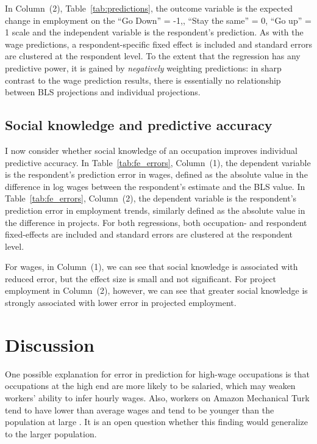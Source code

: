 \documentclass[12pt]{article}
\begin{document}
In Column~(2), Table~\ref{tab:predictions}, the outcome variable is the expected change in employment on the ``Go Down'' = -1,, ``Stay the same'' = 0, ``Go up'' = 1 scale and the independent variable is the respondent's prediction. 
As with the wage predictions, a respondent-specific fixed effect is included and standard errors are clustered at the respondent level. 
To the extent that the regression has any predictive power, it is gained by \emph{negatively} weighting predictions:
in sharp contrast to the wage prediction results, there is essentially no relationship between BLS projections and individual projections. 

\subsection{Social knowledge and predictive accuracy}

I now consider whether social knowledge of an occupation improves individual predictive accuracy. 
In Table~\ref{tab:fe_errors}, Column~(1), the dependent variable is the respondent's prediction error in wages, defined as the absolute value in the difference in log wages between the respondent's estimate and the BLS value.  
In Table~\ref{tab:fe_errors}, Column~(2), the dependent variable is the respondent's prediction error in employment trends, similarly defined as the absolute value in the difference in projects. 
For both regressions, both occupation- and respondent fixed-effects are included and standard errors are clustered at the respondent level.  



For wages, in Column~(1), we can see that social knowledge is associated with reduced error, but the effect size is small and not significant. 
For project employment in Column~(2), however, we can see that greater social knowledge is strongly associated with lower error in projected employment.  

\section{Discussion}

One possible explanation for error in prediction for high-wage occupations is that occupations at the high end are more likely to be salaried, which may weaken workers' ability to infer hourly wages. 
Also, workers on Amazon Mechanical Turk tend to have lower than average wages and tend to be younger than the population at large \citep{ipeirotis2010demographics}. 
It is an open question whether this finding would generalize to the larger population. 
\end{document}
